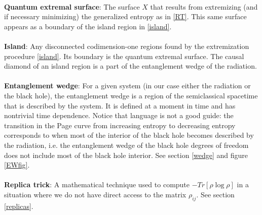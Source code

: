 \\
{\bf Quantum extremal surface}: The surface $X$ that results from extremizing (and if necessary minimizing) the generalized entropy as in \eqref{RT}. This same surface appears as a boundary of the island region in \eqref{island}. \\
\\
{\bf Island}: Any  disconnected codimension-one regions found by the extremization procedure \eqref{island}. Its boundary is the quantum extremal surface. The causal diamond of an island region is a part of the entanglement wedge of the radiation.\\
\\
{\bf Entanglement wedge}: For a given system (in our case either the radiation or the black hole), the entanglement wedge is a region of the semiclassical spacetime that is described by the system.  It is defined at a moment in time and has nontrivial time dependence. Notice that language is not a good guide: the transition in the Page curve from increasing entropy to decreasing entropy corresponds to when most of the interior of the black hole becomes described by the radiation, i.e. the entanglement wedge of the black hole degrees of freedom does not include most of the black hole interior. See section \ref{wedge} and figure \ref{EWfig}. \\
\\
{\bf Replica trick}: A mathematical technique used to compute $-Tr[\rho \log \rho]$ in a situation where we do not have direct access to the matrix $\rho_{ij}$. See section \ref{replicas}.\\
\\



  